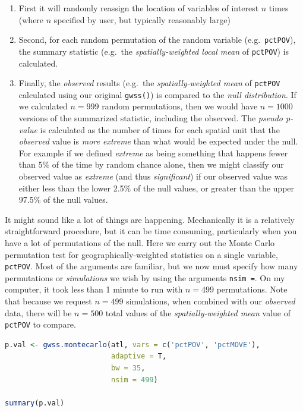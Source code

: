\documentclass[
]{book}
\newcommand{\passthrough}[1]{#1}
\providecommand{\tightlist}{%
  \setlength{\itemsep}{0pt}\setlength{\parskip}{0pt}}
\begin{document}
\begin{enumerate}
\def\labelenumi{\arabic{enumi}.}
\tightlist
\item
  First it will randomly reassign the location of variables of interest \(n\) times (where \(n\) specified by user, but typically reasonably large)
\item
  Second, for each random permutation of the random variable (e.g.~\passthrough{\lstinline!pctPOV!}), the summary statistic (e.g.~the \emph{spatially-weighted local mean} of \passthrough{\lstinline!pctPOV!}) is calculated.\\
\item
  Finally, the \emph{observed} results (e.g.~the \emph{spatially-weighted mean} of \passthrough{\lstinline!pctPOV!} calculated using our original \passthrough{\lstinline!gwss()!}) is compared to the \emph{null distribution}. If we calculated \(n=999\) random permutations, then we would have \(n=1000\) versions of the summarized statistic, including the observed. The \emph{pseudo p-value} is calculated as the number of times for each spatial unit that the \emph{observed} value is \emph{more extreme} than what would be expected under the null. For example if we defined \emph{extreme} as being something that happens fewer than 5\% of the time by random chance alone, then we might classify our observed value as \emph{extreme} (and thus \emph{significant}) if our observed value was either less than the lower 2.5\% of the null values, or greater than the upper 97.5\% of the null values.
\end{enumerate}

It might sound like a lot of things are happening. Mechanically it is a relatively straightforward procedure, but it can be time consuming, particularly when you have a lot of permutations of the null. Here we carry out the Monte Carlo permutation test for geographically-weighted statistics on a single variable, \passthrough{\lstinline!pctPOV!}. Most of the arguments are familiar, but we now must specify how many permutations or \emph{simulations} we wish by using the arguments \passthrough{\lstinline!nsim =!}. On my computer, it took less than 1 minute to run with \(n=499\) permutations. Note that because we request \(n=499\) simulations, when combined with our \emph{observed} data, there will be \(n=500\) total values of the \emph{spatially-weighted mean} value of \passthrough{\lstinline!pctPOV!} to compare.

\begin{lstlisting}[language=R]
p.val <- gwss.montecarlo(atl, vars = c('pctPOV', 'pctMOVE'), 
                         adaptive = T,
                         bw = 35,
                         nsim = 499)

summary(p.val)
\end{lstlisting}
\end{document}

